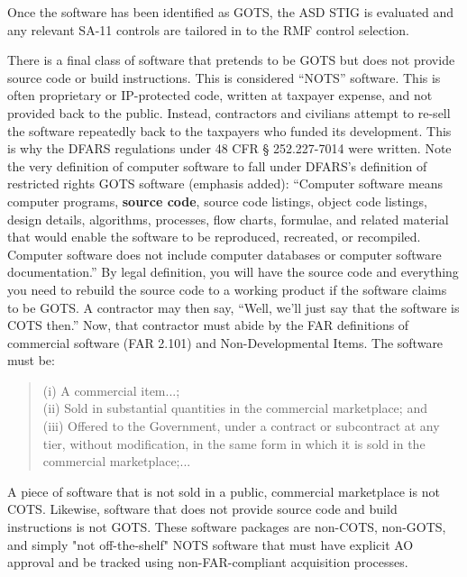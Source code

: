 Once the software has been identified as GOTS, the ASD STIG is evaluated and any relevant SA-11 controls are tailored in to the RMF control selection.

There is a final class of software that pretends to be GOTS but does not provide source code or build instructions. This is considered ``NOTS'' software. This is often proprietary or IP-protected code, written at taxpayer expense, and not provided back to the public. Instead, contractors and civilians attempt to re-sell the software repeatedly back to the taxpayers who funded its development. This is why the DFARS regulations under 48 CFR § 252.227-7014 were written. Note the very definition of computer software to fall under DFARS's definition of restricted rights GOTS software (emphasis added): ``Computer software means computer programs, \textbf{source code}, source code listings, object code listings, design details, algorithms, processes, flow charts, formulae, and related material that would enable the software to be reproduced, recreated, or recompiled. Computer software does not include computer databases or computer software documentation.'' By legal definition, you will have the source code and everything you need to rebuild the source code to a working product if the software claims to be GOTS. A contractor may then say, ``Well, we'll just say that the software is COTS then.'' Now, that contractor must abide by the FAR definitions of commercial software (FAR 2.101) and Non-Developmental Items. The software must be:
\begin{quote}(i) A commercial item...;\\
(ii) Sold in substantial quantities in the commercial marketplace; and\\
(iii) Offered to the Government, under a contract or subcontract at any tier, without modification, in the same form in which it is sold in the commercial marketplace;...\autocite{20210405-far}\end{quote}

A piece of software that is not sold in a public, commercial marketplace is not COTS. Likewise, software that does not provide source code and build instructions is not GOTS. These software packages are non-COTS, non-GOTS, and simply "not off-the-shelf" NOTS software that must have explicit AO approval and be tracked using non-FAR-compliant acquisition processes.

